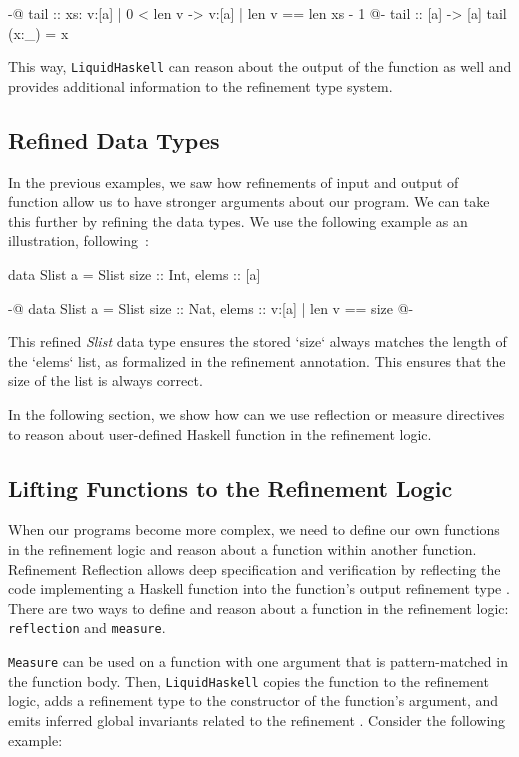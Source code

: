 \documentclass[]{rptuseminar}
\begin{document}
\begin{haskell}
 {-@ tail :: xs: {v:[a] | 0 < len v} -> {v:[a] | len v == len xs - 1} @-}
 tail :: [a] -> [a]
 tail (x:_) = x
\end{haskell}

This way, \texttt{LiquidHaskell} can reason about the output of the 
function as well and provides additional information to the refinement type system.


\subsection{Refined Data Types}
In the previous examples, we saw how refinements of input and output of function allow us to have stronger arguments about our program. 
We can take this further by refining the data types. 
We use the following example as an illustration, following~\cite{jhala_programming_2020}:
\begin{haskell}
  data Slist a = Slist { size :: Int, elems :: [a] }

  {-@ data Slist a = Slist { size :: Nat, elems :: {v:[a] | len v == size} } @-}
\end{haskell}

This refined \textit{Slist} data type ensures the stored `size` always matches the length of the `elems` list, 
as formalized in the refinement annotation. 
This ensures that the size of the list is always correct.

In the following section, we show how can we use reflection or measure directives to reason about user-defined Haskell function in the refinement logic.

\subsection{Lifting Functions to the Refinement Logic}
\label{sec:reflection}
When our programs become more complex, we need to define our own functions in the refinement logic and reason about
a function within another function. Refinement Reflection allows deep specification and verification by 
reflecting the code implementing a Haskell function into the function’s output refinement type \cite{niki_blog_2016}.
There are two ways to define and reason about a function in the refinement logic: \texttt{reflection} and \texttt{measure}. 

\texttt{Measure} can be used on a function with one argument that is pattern-matched in the function body. Then,
\texttt{LiquidHaskell} copies the function to the refinement logic, adds a refinement type to the constructor of the function's argument, and emits inferred global
invariants related to the refinement \cite{niki_lecture_2024}. Consider the following example:
\end{document}
